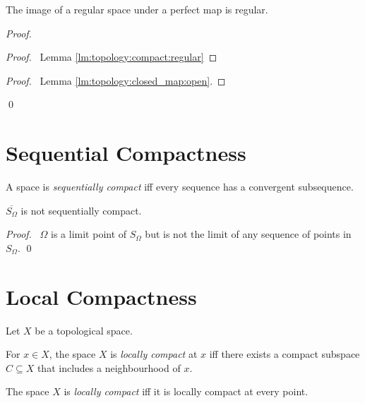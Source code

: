 \begin{prop}
  \label{prop:topology:regular:perfect_map}
  The image of a regular space under a perfect map is regular.
\end{prop}

\begin{proof}
  \pf
  \begin{proof}
    \pf\ Lemma \ref{lm:topology:compact:regular}
  \end{proof}
  \begin{proof}
    \pf\ Lemma \ref{lm:topology:closed_map:open}.
  \end{proof}
  \qed
\end{proof}

\section{Sequential Compactness}

\begin{df}
  A space is \emph{sequentially compact} iff every sequence has a convergent
  subsequence.
\end{df}

 \begin{prop}
 $\overline{S_\Omega}$ is not sequentially compact.
\end{prop}

\begin{proof}
\pf\ $\Omega$ is a limit point of $S_\Omega$ but is not the limit of any
sequence of points in $S_\Omega$. \qed
\end{proof}

\section{Local Compactness}

\begin{df}
  Let $X$ be a topological space.

  For $x \in X$, the space $X$ is \emph{locally compact} at $x$ iff there
  exists a compact subspace $C \subseteq X$ that includes a neighbourhood of
  $x$.

  The space $X$ is \emph{locally compact} iff it is locally compact at every
  point.
\end{df}

